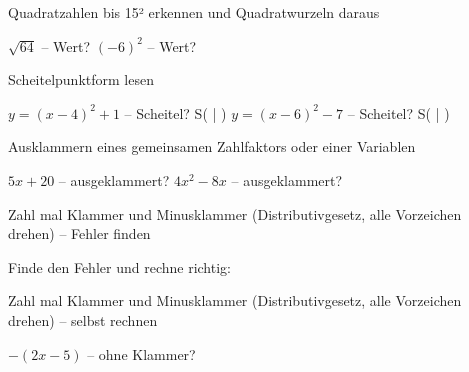 \begin{aufgabe}{Quadratzahlen bis 15² erkennen und Quadratwurzeln daraus}
\begin{teile}
\teil $\sqrt{64}$ – Wert? \leerfeld
\teil $(-6)^2$ – Wert? \leerfeld
\end{teile}
\end{aufgabe}

\begin{aufgabe}{Scheitelpunktform lesen}
\begin{teile}
\teil $y = (x - 4)^2 + 1$ – Scheitel? S( \leerfeld | \leerfeld )
\teil $y = (x - 6)^2 - 7$ – Scheitel? S( \leerfeld | \leerfeld )
\end{teile}
\end{aufgabe}

\begin{aufgabe}{Ausklammern eines gemeinsamen Zahlfaktors oder einer Variablen}
\begin{teile}
\teil $5x + 20$ – ausgeklammert? \leerfeld
\teil $4x^2 - 8x$ – ausgeklammert? \leerfeld
\end{teile}
\end{aufgabe}

\begin{aufgabe}{Zahl mal Klammer und Minusklammer (Distributivgesetz, alle Vorzeichen drehen) – Fehler finden}
\begin{teile}
\teil Finde den Fehler und rechne richtig: 
\end{teile}
\end{aufgabe}

\begin{aufgabe}{Zahl mal Klammer und Minusklammer (Distributivgesetz, alle Vorzeichen drehen) – selbst rechnen}
\begin{teile}
\teil $-(2x - 5)$ – ohne Klammer? \leerfeld
\end{teile}
\end{aufgabe}

